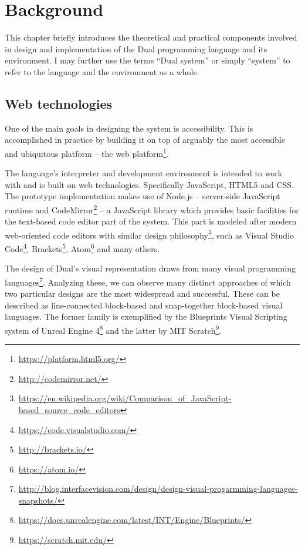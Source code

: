 \chapter{Background}\label{chap:background}


This chapter briefly introduces the theoretical and practical components involved in design and implementation of the Dual programming language and its environment. I may further use the terms ``Dual system'' or simply ``system'' to refer to the language and the environment as a whole.

\section{Web technologies}
One of the main goals in designing the system is accessibility. This is accomplished in practice by building it on top of arguably the most accessible and ubiquitous platform -- the web platform\footnote{\url{https://platform.html5.org/}}.

The language's interpreter and development environment is intended to work with and is built on web technologies. Specifically JavaScript, HTML5 and CSS. The prototype implementation makes use of Node.js -- server-side JavaScript runtime and CodeMirror\footnote{\url{http://codemirror.net/}} -- a JavaScript library which provides basic facilities for the text-based code editor part of the system. This part is modeled after modern web-oriented code editors with similar design philosophy\footnote{\url{https://en.wikipedia.org/wiki/Comparison_of_JavaScript-based_source_code_editors}}, such as Visual Studio Code\footnote{\url{https://code.visualstudio.com/}}, Brackets\footnote{\url{http://brackets.io/}}, Atom\footnote{\url{https://atom.io/}} and many others.

The design of Dual's visual representation draws from many visual programming languages\footnote{\url{
http://blog.interfacevision.com/design/design-visual-progarmming-languages-snapshots/}}. Analyzing these, we can observe many distinct approaches of which two particular designs are the most widespread and successful. These can be described as line-connected block-based and snap-together block-based visual languages. The former family is exemplified by the Blueprints Visual Scripting system of Unreal Engine 4\footnote{\url{https://docs.unrealengine.com/latest/INT/Engine/Blueprints/}} and the latter by MIT Scratch\footnote{\url{https://scratch.mit.edu/}}.

